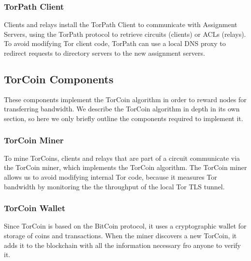 \subsubsection{TorPath Client} Clients and relays install the TorPath Client to
communicate with Assignment Servers, using the TorPath protocol to retrieve
circuits (clients) or ACLs (relays). To avoid modifying Tor client code, TorPath
can use a local DNS proxy to redirect requests to directory servers to the new
assignment servers.

\subsection{TorCoin Components} These components implement the TorCoin algorithm
in order to reward nodes for transferring bandwidth. We describe the TorCoin algorithm in depth in its own section, so here we only briefly outline the 
components required to implement it.

\subsubsection{TorCoin Miner} To mine TorCoins, clients and relays that are part
of a circuit communicate via the TorCoin miner, which implements the TorCoin
algorithm. The TorCoin miner allows us to avoid modifying internal Tor code,
because it measures Tor bandwidth by monitoring the the throughput of the local
Tor TLS tunnel.

\subsubsection{TorCoin Wallet} Since TorCoin is based on the BitCoin protocol,
it uses a cryptographic wallet for storage of coins and transactions. When the
miner discovers a new TorCoin, it adds it to the blockchain with all the
information necessary fro anyone to verify it.